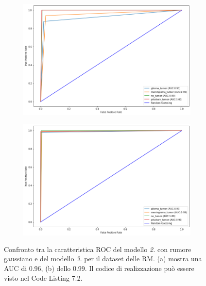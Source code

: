\begin{figure}[hb!]
    \begin{subfigure}{0.5\textwidth}
      \centering
      \includegraphics[width=1\textwidth]{Figures/roc-alexnet.png}
      \caption{}
      \label{fig:snap1}
    \end{subfigure}%
    \begin{subfigure}{0.5\textwidth}
      \centering
      \includegraphics[width=1\textwidth]{Figures/ROC-pretrained.png}
      \caption{}
      \label{fig:snap2}
    \end{subfigure}%
    \caption{Confronto tra la caratteristica ROC del modello \emph{2.} con rumore gaussiano e del modello \emph{3.} per il dataset delle RM.
    (a) mostra una AUC di 0.96, (b) dello 0.99. Il codice di realizzazione può essere visto nel Code Listing 7.2.
    }
    \label{fig:fig}
\end{figure} 


 